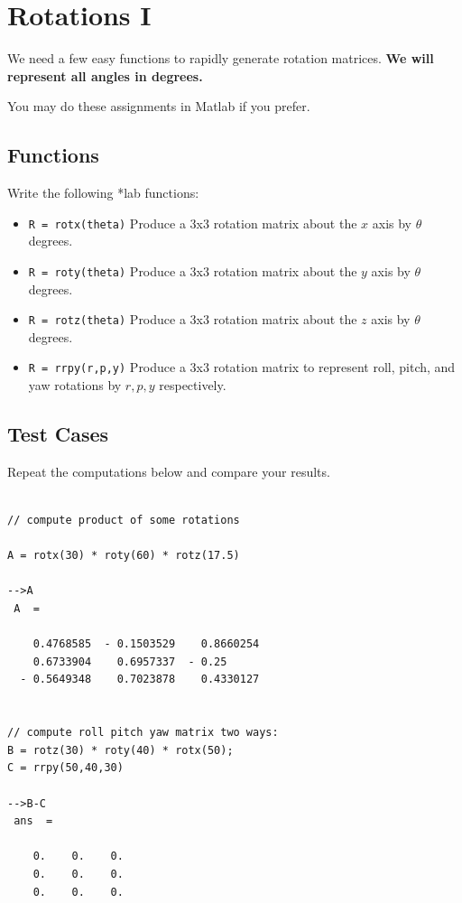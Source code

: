 \documentclass{article}
\begin{document}
\section{Rotations I}

We need a few easy functions to rapidly generate rotation matrices.  {\bf We will represent all angles in degrees.}

You may do these assignments in Matlab if you prefer. 
\subsection{Functions}
Write the following *lab functions:

\begin{itemize}
  \item {\tt R = rotx(theta)}  Produce a 3x3 rotation matrix about the $x$ axis by $\theta$ degrees.
  \item {\tt R = roty(theta)}  Produce a 3x3 rotation matrix about the $y$ axis by $\theta$ degrees.
  \item {\tt R = rotz(theta)}  Produce a 3x3 rotation matrix about the $z$ axis by $\theta$ degrees.
  \item {\tt R = rrpy(r,p,y)}  Produce a 3x3 rotation matrix to represent roll, pitch, and yaw rotations by $r, p, y$ respectively.
\end{itemize}

\subsection{Test Cases}
Repeat the computations below and compare your results.

\begin{verbatim}

// compute product of some rotations

A = rotx(30) * roty(60) * rotz(17.5)

-->A
 A  =

    0.4768585  - 0.1503529    0.8660254
    0.6733904    0.6957337  - 0.25
  - 0.5649348    0.7023878    0.4330127


// compute roll pitch yaw matrix two ways:
B = rotz(30) * roty(40) * rotx(50);
C = rrpy(50,40,30)

-->B-C
 ans  =

    0.    0.    0.
    0.    0.    0.
    0.    0.    0.


\end{verbatim}
\end{document}
